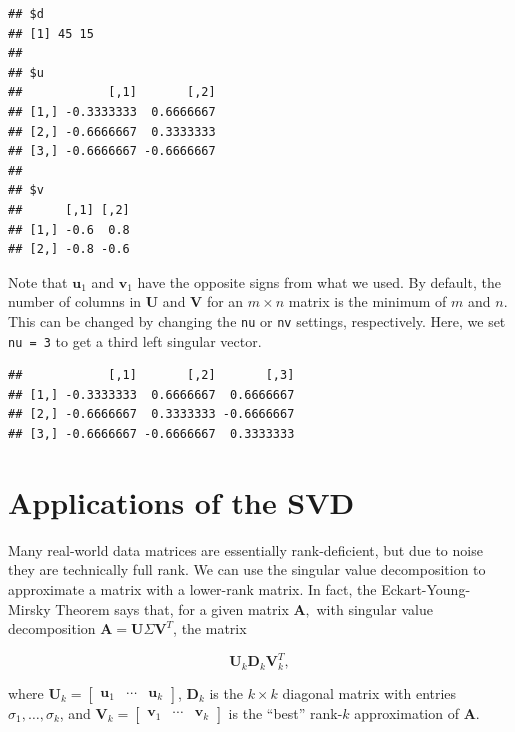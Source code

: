 \documentclass[
]{book}
\newenvironment{Shaded}{\begin{snugshade}}{\end{snugshade}}
\newcommand{\AttributeTok}[1]{\textcolor[rgb]{0.13,0.29,0.53}{#1}}
\newcommand{\DecValTok}[1]{\textcolor[rgb]{0.00,0.00,0.81}{#1}}
\newcommand{\FunctionTok}[1]{\textcolor[rgb]{0.13,0.29,0.53}{\textbf{#1}}}
\newcommand{\NormalTok}[1]{#1}
\newcommand{\SpecialCharTok}[1]{\textcolor[rgb]{0.81,0.36,0.00}{\textbf{#1}}}
\theoremstyle{definition}
\theoremstyle{definition}
\theoremstyle{definition}
\theoremstyle{definition}
\theoremstyle{remark}
\begin{document}
\begin{verbatim}
## $d
## [1] 45 15
## 
## $u
##            [,1]       [,2]
## [1,] -0.3333333  0.6666667
## [2,] -0.6666667  0.3333333
## [3,] -0.6666667 -0.6666667
## 
## $v
##      [,1] [,2]
## [1,] -0.6  0.8
## [2,] -0.8 -0.6
\end{verbatim}

Note that \(\mathbf{u}_1\) and \(\mathbf{v}_1\) have the opposite signs from what we used. By default, the number of columns in \(\mathbf{U}\) and \(\mathbf{V}\) for an \(m\times n\) matrix is the minimum of \(m\) and \(n.\) This can be changed by changing the \texttt{nu} or \texttt{nv} settings, respectively. Here, we set \texttt{nu\ =\ 3} to get a third left singular vector.

\begin{Shaded}
\end{Shaded}

\begin{verbatim}
##            [,1]       [,2]       [,3]
## [1,] -0.3333333  0.6666667  0.6666667
## [2,] -0.6666667  0.3333333 -0.6666667
## [3,] -0.6666667 -0.6666667  0.3333333
\end{verbatim}

\section{Applications of the SVD}\label{applications-of-the-svd}

Many real-world data matrices are essentially rank-deficient, but due to noise they are technically full rank. We can use the singular value decomposition to approximate a matrix with a lower-rank matrix. In fact, the Eckart-Young-Mirsky Theorem\autocite{EYM} says that, for a given matrix \(\mathbf{A},\) with singular value decomposition \(\mathbf{A}=\mathbf{U}\Sigma\mathbf{V}^T\), the matrix

\[\mathbf{U}_k\mathbf{D}_k\mathbf{V}_k^T,\]

where \(\mathbf{U}_k=\begin{bmatrix}\mathbf{u}_1 & \cdots & \mathbf{u}_k\end{bmatrix}\), \(\mathbf{D}_k\) is the \(k\times k\) diagonal matrix with entries \(\sigma_1,\dots,\sigma_k\), and \(\mathbf{V}_k=\begin{bmatrix}\mathbf{v}_1 & \cdots & \mathbf{v}_k\end{bmatrix}\) is the ``best'' rank-\(k\) approximation of \(\mathbf{A}.\)
\end{document}
